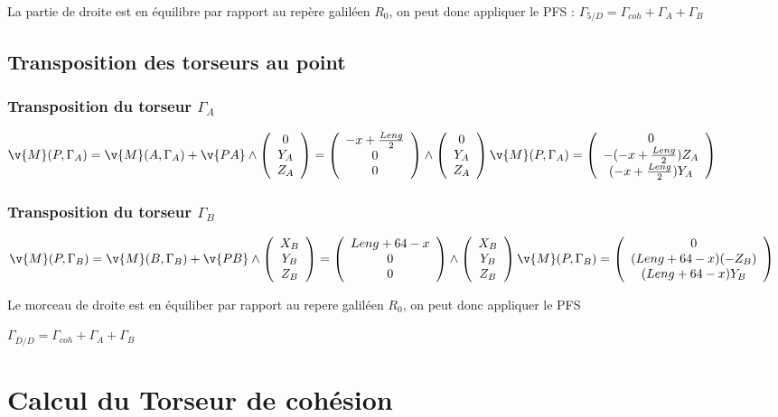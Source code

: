 \n 
La partie de droite est en équilibre par rapport au repère galiléen $R_0$, on peut donc appliquer le PFS :\n
$\Gamma_{5/D} = \Gamma_{coh} + \Gamma_A + \Gamma_B$

\subsection{Transposition des torseurs au point }

\subsubsection{Transposition du torseur $\Gamma_A$}

$
\v{M}(P,\Gamma_A) = \v{M}(A,\Gamma_A)+\v{PA}\wedge \evec{0}{Y_A}{Z_A} = \evec{-x + \frac{Leng}{2}}{0}{0} \wedge \evec{0}{Y_A}{Z_A} \newline \v{M}(P,\Gamma_A) = \evec{0}{-(-x+\frac{Leng}{2})Z_A}{(-x+\frac{Leng}{2})Y_A} $

\subsubsection{Transposition du torseur $\Gamma_B$}

$
\v{M}(P,\Gamma_B) = \v{M}(B,\Gamma_B) + \v{PB} \wedge \evec{X_B}{Y_B}{Z_B} = \evec{Leng + 64 - x}{0}{0} \wedge \evec{X_B}{Y_B}{Z_B} \n
\v{M}(P,\Gamma_B) = \evec{0}{(Leng + 64 - x)(-Z_B)}{(Leng + 64 - x)Y_B}
$\n\n 


Le morceau de droite est en équiliber par rapport au repere galiléen $R_0$, on peut donc appliquer le PFS




$\Gamma_{\overline{D}/D} = \Gamma_{coh} + \Gamma_A +\Gamma_B $
\section{Calcul du Torseur de cohésion}

